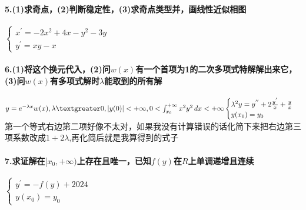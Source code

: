 \documentclass{article}
\begin{document}
    \paragraph{5.(1)求奇点，(2)判断稳定性，(3)求奇点类型并，画线性近似相图}
    $
    \begin{cases} 
        x^{'} = -2x^{2}+4x-y^{2}-3y \\
        y^{'} = xy-x
    \end{cases}
    $ 
    \paragraph{6.(1)将这个换元代入，(2)问$w(x)$有一个首项为1的二次多项式特解解出来它，(3)问$w(x)$有多项式解时$\lambda$能取到的所有解}
    $
    y = e^{-\lambda x}w(x),\lambda \textgreater 0,|y(0)| < +\infty,0 < \int_{x_0}^{+\infty} x^{2}y^{2} \,dx < +\infty
    \\
    \begin{cases} 
        \lambda^{2}y = y^{''} +2\frac{y^{'}}{x}+\frac{y}{x} \\
        y(x_0)=y_0
    \end{cases}
    $
    第一个等式右边第二项好像不太对，如果我没有计算错误的话化简下来把右边第三项系数改成$1+2\lambda$,再化简后就是我算得到的式子
    \paragraph{7.求证解在$[x_0,+\infty)$上存在且唯一，已知$f(y)$在$R$上单调递增且连续 }
    $
    \begin{cases} 
        y^{'} = -f(y)+2024 \\
        y(x_0)=y_0
    \end{cases}
    $
\end{document}
